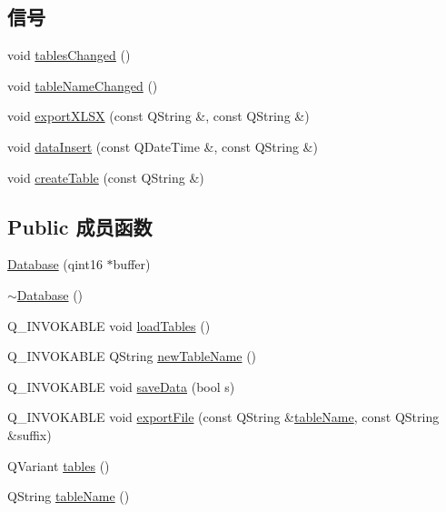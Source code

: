 \subsection*{信号}
\begin{DoxyCompactItemize}
\item 
void \hyperlink{class_database_aa804ee053ba71d1e7c711a440968b9bc}{tables\+Changed} ()
\item 
void \hyperlink{class_database_a0ed84bd7f656e5fabadd579a0cbcbc57}{table\+Name\+Changed} ()
\item 
void \hyperlink{class_database_a1581c3afe4b3b9427620a55f29e0910b}{export\+X\+L\+SX} (const Q\+String \&, const Q\+String \&)
\item 
void \hyperlink{class_database_a083b4f32eff1dd87f48f6ccb46f3218e}{data\+Insert} (const Q\+Date\+Time \&, const Q\+String \&)
\item 
void \hyperlink{class_database_a4534ad8a6b59a7bf06d287911c38421a}{create\+Table} (const Q\+String \&)
\end{DoxyCompactItemize}
\subsection*{Public 成员函数}
\begin{DoxyCompactItemize}
\item 
\hyperlink{class_database_acad5a1c9dd5a5051e3967024dc96373a}{Database} (qint16 $\ast$buffer)
\item 
\hyperlink{class_database_a84d399a2ad58d69daab9b05330e1316d}{$\sim$\+Database} ()
\item 
Q\+\_\+\+I\+N\+V\+O\+K\+A\+B\+LE void \hyperlink{class_database_a8eecdb8ab49878d43a41d5e29c3c35a2}{load\+Tables} ()
\item 
Q\+\_\+\+I\+N\+V\+O\+K\+A\+B\+LE Q\+String \hyperlink{class_database_a2c471d41d2dd4341ff510e06a0c8c6a5}{new\+Table\+Name} ()
\item 
Q\+\_\+\+I\+N\+V\+O\+K\+A\+B\+LE void \hyperlink{class_database_a6192c09a9cba8435c61c779d519e57b0}{save\+Data} (bool s)
\item 
Q\+\_\+\+I\+N\+V\+O\+K\+A\+B\+LE void \hyperlink{class_database_adcec92191ed1c8773bcf82f676a0e87b}{export\+File} (const Q\+String \&\hyperlink{class_database_a9f617c90d57d4c5b14e96e51c1aea92b}{table\+Name}, const Q\+String \&suffix)
\item 
Q\+Variant \hyperlink{class_database_a47600e88e0ff9dea23b9e3ee27ed55bf}{tables} ()
\item 
Q\+String \hyperlink{class_database_aa5f9ba4502bd54b08a1c04381cc8d361}{table\+Name} ()
\end{DoxyCompactItemize}
